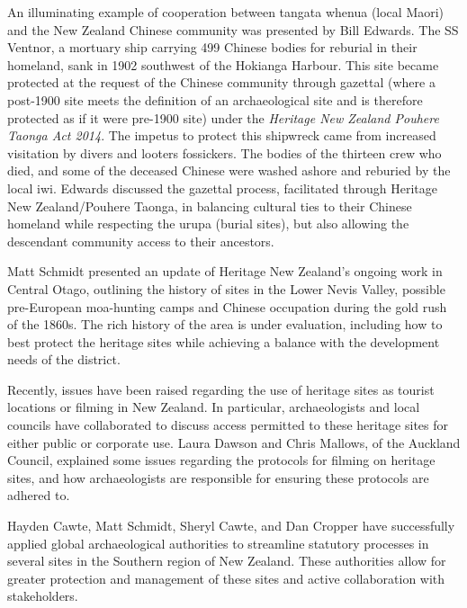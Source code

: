 
An illuminating example of cooperation between tangata whenua (local Maori) and the New Zealand Chinese community was presented by Bill Edwards. The SS Ventnor, a mortuary ship carrying 499 Chinese bodies for reburial in their homeland, sank in 1902 southwest of the Hokianga Harbour. This site became protected at the request of the Chinese community through gazettal (where a post-1900 site meets the definition of an archaeological site and is therefore protected as if it were pre-1900 site) under the \textit{Heritage New Zealand Pouhere Taonga Act 2014}. The impetus to protect this shipwreck came from increased visitation by divers and looters fossickers. The bodies of the thirteen crew who died, and some of the deceased Chinese were washed ashore and reburied by the local iwi. Edwards discussed the gazettal process, facilitated through Heritage New Zealand/Pouhere Taonga, in balancing cultural ties to their Chinese homeland while respecting the urupa (burial sites), but also allowing the descendant community access to their ancestors.

Matt Schmidt presented an update of Heritage New Zealand’s ongoing work in Central Otago, outlining the history of sites in the Lower Nevis Valley, possible pre-European moa-hunting camps and Chinese occupation during the gold rush of the 1860s. The rich history of the area is under evaluation, including how to best protect the heritage sites while achieving a balance with the development needs of the district.

Recently, issues have been raised regarding the use of heritage sites as tourist locations or filming in New Zealand. In particular, archaeologists and local councils have collaborated to discuss access permitted to these heritage sites for either public or corporate use. Laura Dawson and Chris Mallows, of the Auckland Council, explained some issues regarding the protocols for filming on heritage sites, and how archaeologists are responsible for ensuring these protocols are adhered to. 

Hayden Cawte, Matt Schmidt, Sheryl Cawte, and Dan Cropper have successfully applied global archaeological authorities to streamline statutory processes in several sites in the Southern region of New Zealand. These authorities allow for greater protection and management of these sites and active collaboration with stakeholders.  

